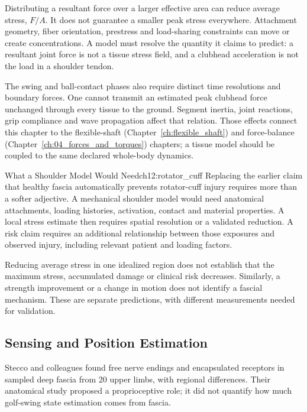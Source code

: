 Distributing a resultant force over a larger effective area can reduce average stress, $F/A$. It does not guarantee a smaller peak stress everywhere. Attachment geometry, fiber orientation, prestress and load-sharing constraints can move or create concentrations. A model must resolve the quantity it claims to predict: a resultant joint force is not a tissue stress field, and a clubhead acceleration is not the load in a shoulder tendon.

The swing and ball-contact phases also require distinct time resolutions and boundary forces. One cannot transmit an estimated peak clubhead force unchanged through every tissue to the ground. Segment inertia, joint reactions, grip compliance and wave propagation affect that relation. Those effects connect this chapter to the flexible-shaft (Chapter~\ref{ch:flexible_shaft}) and force-balance (Chapter~\ref{ch:04_forces_and_torques}) chapters; a tissue model should be coupled to the same declared whole-body dynamics.

\begin{example}{What a Shoulder Model Would Need}{ch12:rotator_cuff}
Replacing the earlier claim that healthy fascia automatically prevents rotator-cuff injury requires more than a softer adjective. A mechanical shoulder model would need anatomical attachments, loading histories, activation, contact and material properties. A local stress estimate then requires spatial resolution or a validated reduction. A risk claim requires an additional relationship between those exposures and observed injury, including relevant patient and loading factors.

Reducing average stress in one idealized region does not establish that the maximum stress, accumulated damage or clinical risk decreases. Similarly, a strength improvement or a change in motion does not identify a fascial mechanism. These are separate predictions, with different measurements needed for validation.
\end{example}

\subsection{Sensing and Position Estimation}

Stecco and colleagues found free nerve endings and encapsulated receptors in sampled deep fascia from 20 upper limbs, with regional differences. Their anatomical study proposed a proprioceptive role; it did not quantify how much golf-swing state estimation comes from fascia. \citep{fasciaStecco2007}

